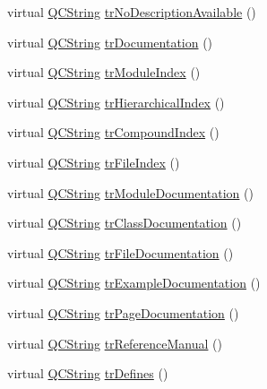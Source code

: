 \begin{DoxyCompactItemize}
\item 
virtual \hyperlink{class_q_c_string}{Q\+C\+String} \hyperlink{class_translator_norwegian_a69b521875e92a6d28d464f1899a45ed3}{tr\+No\+Description\+Available} ()
\item 
virtual \hyperlink{class_q_c_string}{Q\+C\+String} \hyperlink{class_translator_norwegian_aaeef151315b77ece7d99362d620b72f4}{tr\+Documentation} ()
\item 
virtual \hyperlink{class_q_c_string}{Q\+C\+String} \hyperlink{class_translator_norwegian_a59ac28b655bef6be63d1031aa8716eb6}{tr\+Module\+Index} ()
\item 
virtual \hyperlink{class_q_c_string}{Q\+C\+String} \hyperlink{class_translator_norwegian_af7745b75b85b42d0d9fa02f706f3a705}{tr\+Hierarchical\+Index} ()
\item 
virtual \hyperlink{class_q_c_string}{Q\+C\+String} \hyperlink{class_translator_norwegian_a6d566b4eae7efeff34766a62523ae7cc}{tr\+Compound\+Index} ()
\item 
virtual \hyperlink{class_q_c_string}{Q\+C\+String} \hyperlink{class_translator_norwegian_a2fe4f0090ea4b14ab7624ea3ced45e64}{tr\+File\+Index} ()
\item 
virtual \hyperlink{class_q_c_string}{Q\+C\+String} \hyperlink{class_translator_norwegian_a28824c22c658ed3f6d166de628d202c1}{tr\+Module\+Documentation} ()
\item 
virtual \hyperlink{class_q_c_string}{Q\+C\+String} \hyperlink{class_translator_norwegian_aae6f1f2f29b67ff9410077edbc6910fd}{tr\+Class\+Documentation} ()
\item 
virtual \hyperlink{class_q_c_string}{Q\+C\+String} \hyperlink{class_translator_norwegian_a8c2958c015db8ddd54a00387e6a5faad}{tr\+File\+Documentation} ()
\item 
virtual \hyperlink{class_q_c_string}{Q\+C\+String} \hyperlink{class_translator_norwegian_a8b0d3f953b275be330604a73f4d2367e}{tr\+Example\+Documentation} ()
\item 
virtual \hyperlink{class_q_c_string}{Q\+C\+String} \hyperlink{class_translator_norwegian_a4bc20393742ef7e9a05a8e63ae3b01a3}{tr\+Page\+Documentation} ()
\item 
virtual \hyperlink{class_q_c_string}{Q\+C\+String} \hyperlink{class_translator_norwegian_a9b6f0458a1a819871e240abb2d77b179}{tr\+Reference\+Manual} ()
\item 
virtual \hyperlink{class_q_c_string}{Q\+C\+String} \hyperlink{class_translator_norwegian_a530dd3cfaf5ca077cea50df989421779}{tr\+Defines} ()
\item 

\end{DoxyCompactItemize}
